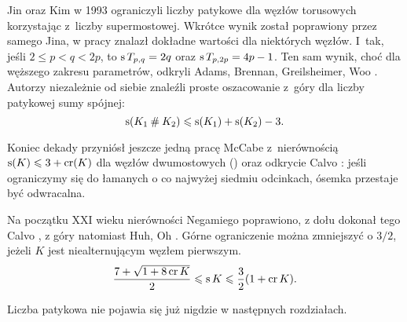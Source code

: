 Jin oraz Kim w 1993 ograniczyli liczby patykowe dla węzłów torusowych korzystając z~liczby supermostowej.
%
%
Wkrótce wynik został poprawiony przez samego Jina, w pracy \cite{jin1997} znalazł dokładne wartości dla niektórych węzłów.
I~tak, jeśli $2 \le p < q < 2p$, to $\operatorname{s} T_{p,q} = 2q$ oraz $\operatorname{s} T_{p, 2p} = 4p-1$.
Ten sam wynik, choć dla węższego zakresu parametrów, odkryli Adams, Brennan, Greilsheimer, Woo \cite{greilsheimer1997}.
%
%
%
%
%
Autorzy niezależnie od siebie znaleźli proste oszacowanie z~góry dla liczby patykowej sumy spójnej:
\begin{equation}
    \operatorname{s}(K_1 \mathbin{\#} K_2) \leqslant \operatorname{s}(K_1) + \operatorname{s}(K_2) - 3.
\end{equation}

Koniec dekady przyniósł jeszcze jedną pracę McCabe z~nierównością $\operatorname{s}(K) \leqslant 3 + \operatorname{cr} (K)$ dla węzłów dwumostowych (\cite{mccabe1998}) oraz odkrycie Calvo \cite{calvo2001}: jeśli ograniczymy się do łamanych o co najwyżej siedmiu odcinkach, ósemka przestaje być odwracalna.
%
%

Na początku XXI wieku nierówności Negamiego poprawiono, z dołu dokonał tego Calvo \cite{calvo2001}, z góry natomiast Huh, Oh \cite{huh2011}.
%
%
%
Górne ograniczenie można zmniejszyć o $3/2$, jeżeli $K$ jest niealternującym węzłem pierwszym.
\begin{equation}
    \frac{7+\sqrt{1 + 8 \operatorname{cr} K}}{2} \leqslant \operatorname{s} K \leqslant \frac{3}{2} (1 + \operatorname{cr} K).
\end{equation}

Liczba patykowa nie pojawia się już nigdzie w następnych rozdziałach.


%


